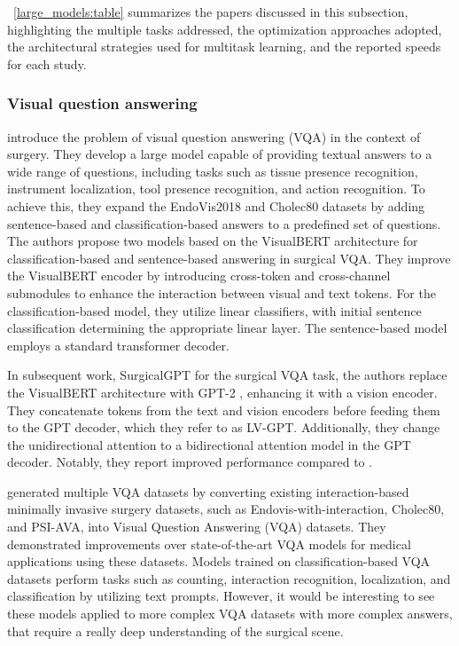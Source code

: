 \documentclass[times,twocolumn,final]{elsarticle}
\newcommand{\tabref}[1]{\tablename~\ref{#1}}
\begin{document}
\tabref{large_models:table} summarizes the papers discussed in this subsection, highlighting the multiple tasks addressed, the optimization approaches adopted, the architectural strategies used for multitask learning, and the reported speeds for each study.



\subsubsection{Visual question answering}
\citet{seenivasan2022surgical} introduce the problem of visual question answering (VQA) in the context of surgery. They develop a large model capable of providing textual answers to a wide range of questions, including tasks such as tissue presence recognition, instrument localization, tool presence recognition, and action recognition. To achieve this, they expand the EndoVis2018 and Cholec80 datasets by adding sentence-based and classification-based answers to a predefined set of questions. The authors propose two models based on the VisualBERT architecture \citep{li2019visualbert} for classification-based and sentence-based answering in surgical VQA. They improve the VisualBERT encoder by introducing cross-token and cross-channel submodules to enhance the interaction between visual and text tokens. For the classification-based model, they utilize linear classifiers, with initial sentence classification determining the appropriate linear layer. The sentence-based model employs a standard transformer decoder.

In subsequent work, SurgicalGPT \citep{seenivasan2023surgicalgpt} for the surgical VQA task, the authors replace the VisualBERT architecture with GPT-2 \citep{radford2019language}, enhancing it with a vision encoder. They concatenate tokens from the text and vision encoders before feeding them to the GPT decoder, which they refer to as LV-GPT. Additionally, they change the unidirectional attention to a bidirectional attention model in the GPT decoder. Notably, they report improved performance compared to \citet{seenivasan2022surgical}. 

\citet{seenivasan2022surgical,seenivasan2023surgicalgpt} generated multiple VQA datasets by converting existing interaction-based minimally invasive surgery datasets, such as Endovis-with-interaction, Cholec80, and PSI-AVA, into Visual Question Answering (VQA) datasets. They demonstrated improvements over state-of-the-art VQA models for medical applications using these datasets.
Models trained on classification-based VQA datasets perform tasks such as counting, interaction recognition, localization, and classification by utilizing text prompts. However, it would be interesting to see these models applied to more complex VQA datasets with more complex answers, that require a really deep understanding of the surgical scene.  
\end{document}
